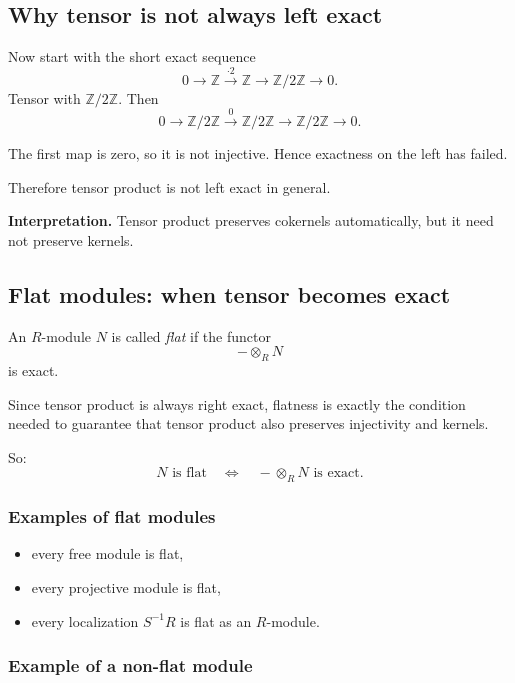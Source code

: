 \documentclass[12pt,a4paper]{article}
\theoremstyle{notespace}
\theoremstyle{definition}
\begin{document}
\subsection{ Why tensor is not always left exact}

Now start with the short exact sequence
\[
0 \longrightarrow \mathbb Z \xrightarrow{\cdot 2} \mathbb Z \longrightarrow \mathbb Z/2\mathbb Z \longrightarrow 0.
\]
Tensor with \(\mathbb Z/2\mathbb Z\). Then
\[
0 \longrightarrow \mathbb Z/2\mathbb Z \xrightarrow{0} \mathbb Z/2\mathbb Z \longrightarrow \mathbb Z/2\mathbb Z \longrightarrow 0.
\]

The first map is zero, so it is not injective.
Hence exactness on the left has failed.

Therefore tensor product is not left exact in general.

\medskip

\textbf{Interpretation.}
Tensor product preserves cokernels automatically, but it need not preserve kernels.

\subsection{ Flat modules: when tensor becomes exact}

An \(R\)-module \(N\) is called \emph{flat} if the functor
\[
-\otimes_R N
\]
is exact.

Since tensor product is always right exact, flatness is exactly the condition needed to guarantee that tensor product also preserves injectivity and kernels.

So:
\[
N\text{ is flat}
\quad\Longleftrightarrow\quad
-\otimes_R N \text{ is exact.}
\]

\subsubsection*{Examples of flat modules}

\begin{itemize}
	\item every free module is flat,
	\item every projective module is flat,
	\item every localization \(S^{-1}R\) is flat as an \(R\)-module.
\end{itemize}

\subsubsection*{Example of a non-flat module}
\end{document}
